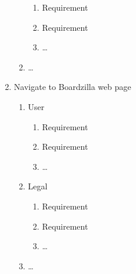 \documentclass[]{article}
\begin{document}
\begin{enumerate}[{BE}1.]
\begin{enumerate}[{VP1}.1]
\begin{enumerate}
				\item Requirement
				\item Requirement
				\item \dots
			\end{enumerate}
		\item \dots
	\end{enumerate}
		\item Navigate to Boardzilla web page
	\begin{enumerate}[{VP1}.1]
		\item User
			\begin{enumerate}
				\item Requirement
				\item Requirement
				\item \dots
			\end{enumerate}
		\item Legal
			\begin{enumerate}
				\item Requirement
				\item Requirement
				\item \dots
			\end{enumerate}
		\item \dots
	\end{enumerate}
\end{enumerate}
\end{document}
